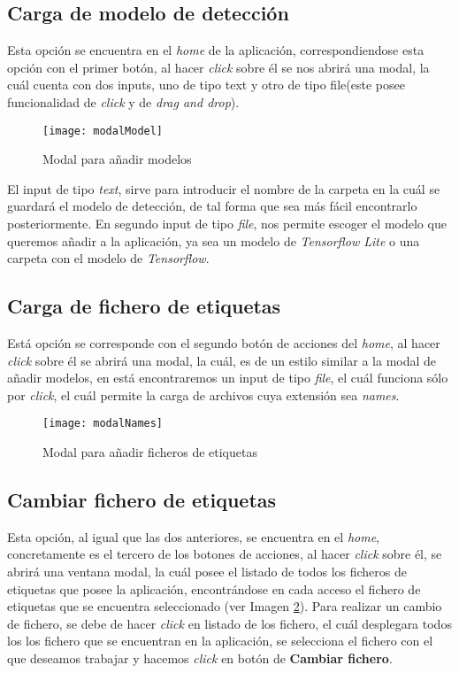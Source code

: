\subsection{Carga de modelo de detección}
Esta opción se encuentra en el \textit{home} de la aplicación, correspondiendose esta opción con el primer botón, al hacer \textit{click} sobre él se nos abrirá una modal, la cuál cuenta con dos inputs, uno de tipo text y otro de tipo file(este posee funcionalidad de \textit{click} y de \textit{drag and drop}).
\begin{figure}[!h]
    \centering
    \texttt{[image: modalModel]}
    \caption{Modal para añadir modelos}\label{fig:modalModel}
\end{figure}
El input de tipo \textit{text}, sirve para introducir el nombre de la carpeta en la cuál se guardará el modelo de detección, de tal forma que sea más fácil encontrarlo posteriormente.
En segundo input de tipo \textit{file}, nos permite escoger el modelo que queremos añadir a la aplicación, ya sea un modelo de \textit{Tensorflow Lite} o una carpeta con el modelo de \textit{Tensorflow}.

\subsection{Carga de fichero de etiquetas}
Está opción se corresponde con el segundo botón de acciones del \textit{home}, al hacer \textit{click} sobre él se abrirá una modal, la cuál, es de un estilo similar a la modal de añadir modelos, en está encontraremos un input de tipo \textit{file}, el cuál funciona sólo por \textit{click}, el cuál permite la carga de archivos cuya extensión sea \textit{names}.
\begin{figure}[!h]
    \centering
    \texttt{[image: modalNames]}
    \caption{Modal para añadir ficheros de etiquetas}\label{fig:modalNames}
\end{figure}

\subsection{Cambiar fichero de etiquetas} \label{Cambiar fichero de etiquetas}
Esta opción, al igual que las dos anteriores, se encuentra en el \textit{home}, concretamente es el tercero de los botones de acciones, al hacer \textit{click} sobre él, se abrirá una ventana modal, la cuál posee el listado de todos los ficheros de etiquetas que posee la aplicación, encontrándose en cada acceso el fichero de etiquetas que se encuentra seleccionado (ver Imagen \ref{fig:modalNames}).
Para realizar un cambio de fichero, se debe de hacer \textit{click} en listado de los fichero, el cuál desplegara todos los los fichero que se encuentran en la aplicación, se selecciona el fichero con el que deseamos trabajar y hacemos \textit{click} en botón de \textbf{Cambiar fichero}.

